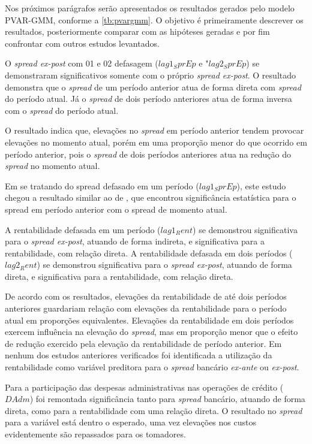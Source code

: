 \documentclass[
  12pt,
  12pt,
  openright,
  oneside,
  a4paper,
  chapter=TITLE,
  section=TITLE,
  subsection=TITLE,
  subsubsection=TITLE,
  english,
  portugues,
  sumario=tradicional]{abntex2}
\begin{document}
Nos próximos parágrafos serão apresentados os resultados gerados pelo modelo PVAR-GMM, conforme a \autoref{tb:pvargmm}. O objetivo é primeiramente descrever os resultados, posteriormente comparar com as hipóteses geradas e por fim confrontar com outros estudos levantados.

O \emph{spread ex-post} com 01 e 02 defasagem (\(lag1_SprEp\) e "\(lag2_SprEp\)) se demonstraram significativos somente com o próprio \emph{spread ex-post}. O resultado demonstra que o \emph{spread} de um período anterior atua de forma direta com \emph{spread} do período atual. Já o \emph{spread} de dois período anteriores atua de forma inversa com o \emph{spread} do período atual.

O resultado indica que, elevações no \emph{spread} em período anterior tendem provocar elevações no momento atual, porém em uma proporção menor do que ocorrido em período anterior, pois o \emph{spread} de dois períodos anteriores atua na redução do \emph{spread} no momento atual.

Em se tratando do spread defasado em um período (\(lag1_SprEp\)), este estudo chegou a resultado similar ao de \textcite{dantas:2012}, que encontrou significância estatística para o spread em período anterior com o spread de momento atual.

A rentabilidade defasada em um período (\(lag1_Rent\)) se demonstrou significativa para o \emph{spread ex-post}, atuando de forma indireta, e significativa para a rentabilidade, com relação direta. A rentabilidade defasada em dois períodos (\(lag2_Rent\)) se demonstrou significativa para o \emph{spread ex-post}, atuando de forma direta, e significativa para a rentabilidade, com relação direta.

De acordo com os resultados, elevações da rentabilidade de até dois períodos anteriores guardariam relação com elevações da rentabilidade para o período atual em proporções equivalentes. Elevações da rentabilidade em dois períodos exercem influência na elevação do \emph{spread}, mas em proporção menor que o efeito de redução exercido pela elevação da rentabilidade de período anterior.
Em nenhum dos estudos anteriores verificados foi identificada a utilização da rentabilidade como variável preditora para o \emph{spread} bancário \emph{ex-ante} ou \emph{ex-post}.

Para a participação das despesas administrativas nas operações de crédito (\(DAdm\)) foi remontada significância tanto para \emph{spread} bancário, atuando de forma direta, como para a rentabilidade com uma relação direta. O resultado no \emph{spread} para a variável está dentro o esperado, uma vez elevações nos custos evidentemente são repassados para os tomadores.
\end{document}
